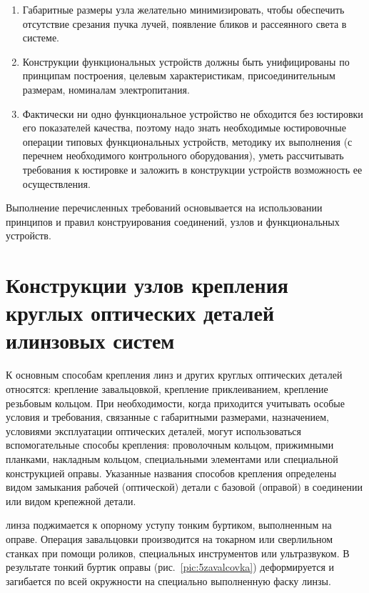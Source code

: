 \begin{enumerate}
	\item Габаритные размеры узла желательно минимизировать, чтобы обеспечить отсутствие срезания пучка лучей, появление бликов и рассеянного света в системе.
	
	\item Конструкции функциональных устройств должны быть унифицированы по принципам построения, целевым характеристикам, присоединительным размерам, номиналам электропитания.
	
	\item Фактически ни одно функциональное устройство не обходится без юстировки его показателей качества, поэтому надо знать необходимые юстировочные операции типовых функциональных устройств, методику их выполнения (с перечнем необходимого контрольного оборудования), уметь рассчитывать требования к юстировке и заложить в конструкции устройств возможность ее осуществления.
	
\end{enumerate}

Выполнение перечисленных требований основывается на использовании принципов и правил конструирования соединений, узлов и функциональных устройств.

\section{Конструкции узлов крепления круглых оптических деталей и\break линзовых систем}

К основным способам крепления линз и других круглых оптических деталей относятся: крепление завальцовкой, крепление приклеиванием, крепление резьбовым кольцом. При необходимости, когда приходится учитывать особые условия и требования, связанные с габаритными размерами, назначением, условиями эксплуатации оптических деталей, могут использоваться вспомогательные способы крепления: проволочным кольцом, прижимными планками, накладным кольцом, специальными элементами или специальной конструкцией оправы. Указанные названия способов крепления определены видом замыкания рабочей (оптической) детали с базовой (оправой) в соединении или видом крепежной детали.

  линза поджимается к опорному уступу тонким буртиком, выполненным на оправе. 
Операция завальцовки производится на токарном или сверлильном станках при помощи роликов, специальных инструментов или ультразвуком. 
В результате тонкий буртик оправы (рис.~\ref{pic:5zavalcovka}) деформируется и загибается по всей окружности на специально выполненную фаску линзы.

